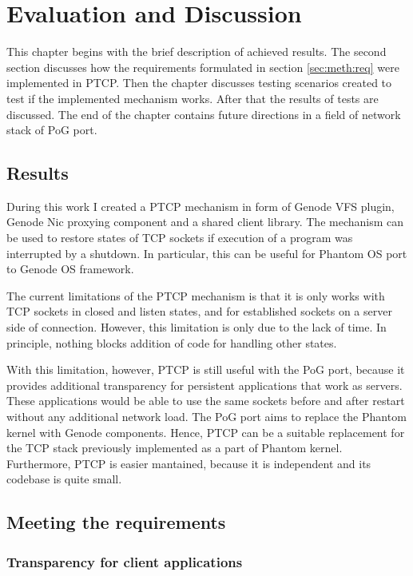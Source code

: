 \chapter{Evaluation and Discussion}
\label{chap:eval}

This chapter begins with the brief description of achieved results. The second
section discusses how the requirements formulated in section
\ref{sec:meth:req} were implemented in PTCP. Then the chapter discusses testing
scenarios created to test if the implemented mechanism works. After that the
results of tests are discussed. The end of the chapter contains future
directions in a field of network stack of PoG port.

\section{Results}
\label{sec:eval:res}

During this work I created a PTCP mechanism in form of Genode VFS plugin,
Genode Nic proxying component and a shared client library. The mechanism can be
used to restore states of TCP sockets if execution of a program was interrupted
by a shutdown. In particular, this can be useful for Phantom OS port to Genode
OS framework. 

The current limitations of the PTCP mechanism is that it is only works with
TCP sockets in closed and listen states, and for established sockets on a
server side of connection. However, this limitation is only due to the lack of
time. In principle, nothing blocks addition of code for handling
other states.

With this limitation, however, PTCP is still useful with the PoG port, because
it provides additional transparency for persistent applications that work as
servers. These applications would be able to use the same sockets before and
after restart without any additional network load. The PoG port aims to
replace the Phantom kernel with Genode components. Hence, PTCP can be a
suitable replacement for the TCP stack previously implemented as a part of
Phantom kernel. Furthermore, PTCP is easier mantained, because it is
independent and its codebase is quite small.

\section{Meeting the requirements}

\subsection{Transparency for client applications}

